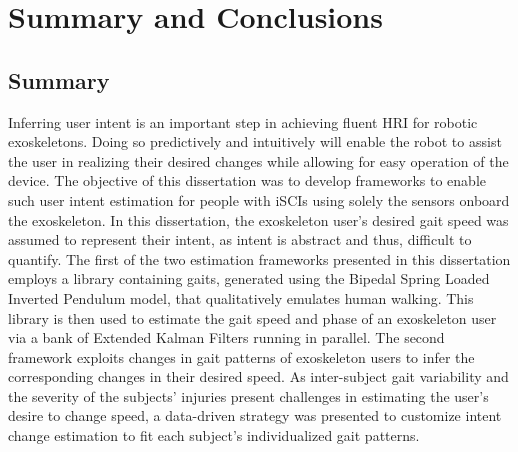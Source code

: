 \chapter{Summary and Conclusions}\label{chapter:conc}
\section{Summary}
Inferring user intent is an important step in achieving fluent HRI for robotic exoskeletons. Doing so predictively and intuitively will enable the robot to assist the user in realizing their desired changes while allowing for easy operation of the device. The objective of this dissertation was to develop frameworks to enable such user intent estimation for people with iSCIs using solely the sensors onboard the exoskeleton. In this dissertation, the exoskeleton user's desired gait speed was assumed to represent their intent, as intent is abstract and thus, difficult to quantify. The first of the two estimation frameworks presented in this dissertation employs a library containing gaits, generated using the Bipedal Spring Loaded Inverted Pendulum model, that qualitatively emulates human walking. This library is then used to estimate the gait speed and phase of an exoskeleton user via a bank of Extended Kalman Filters running in parallel. The second framework exploits changes in gait patterns of exoskeleton users to infer the corresponding changes in their desired speed. As inter-subject gait variability and the severity of the subjects' injuries present challenges in estimating the user's desire to change speed, a data-driven strategy was presented to customize intent change estimation to fit each subject's individualized gait patterns.


